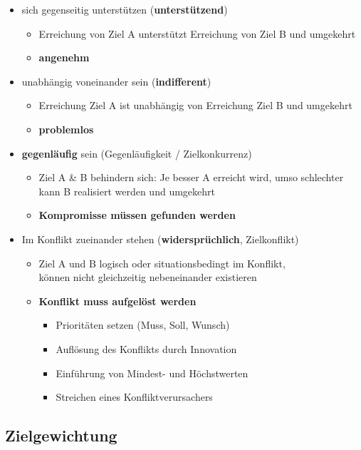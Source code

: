 \documentclass[a4paper]{article}
\begin{document}
			\begin{itemize}
				\item sich gegenseitig unterstützen (\textbf{unterstützend})
					\begin{itemize}
						\item Erreichung von Ziel A unterstützt Erreichung von Ziel B und umgekehrt
						\item \textbf{angenehm}
					\end{itemize}
				\item unabhängig voneinander sein (\textbf{indifferent})
					\begin{itemize}
						\item Erreichung Ziel A ist unabhängig von Erreichung Ziel B und umgekehrt
						\item \textbf{problemlos}
					\end{itemize}
				\item \textbf{gegenläufig} sein (Gegenläufigkeit / Zielkonkurrenz)
					\begin{itemize}
						\item Ziel A \& B behindern sich: Je besser A erreicht wird, umso schlechter kann B realisiert werden und umgekehrt
						\item \textbf{Kompromisse müssen gefunden werden}
					\end{itemize}
				\item Im Konflikt zueinander stehen (\textbf{widersprüchlich}, Zielkonflikt)
					\begin{itemize}
						\item Ziel A und B logisch oder situationsbedingt im Konflikt, \\
						können nicht gleichzeitig nebeneinander existieren
						\item \textbf{Konflikt muss aufgelöst werden}
							\begin{itemize}
								\item Prioritäten setzen (Muss, Soll, Wunsch)
								\item Auflösung des Konflikts durch Innovation
								\item Einführung von Mindest- und Höchstwerten
								\item Streichen eines Konfliktverursachers							
							\end{itemize}
					\end{itemize}
			\end{itemize}
		
		\subsection{Zielgewichtung}
		
\end{document}
